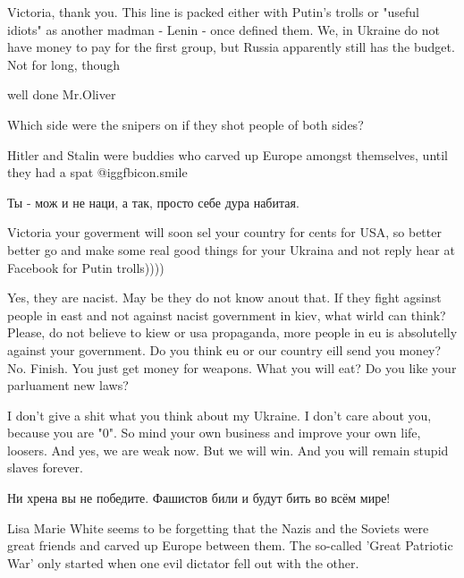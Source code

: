 \begin{itemize}
\begin{itemize}

Victoria, thank you. This line is packed either with Putin's trolls or "useful
idiots" as another madman - Lenin - once defined them. We, in Ukraine do not
have money to pay for the first group, but Russia apparently still has the
budget. Not for long, though


well done Mr.Oliver

Which side were the snipers on if they shot people of both sides?

Hitler and Stalin were buddies who carved up Europe amongst themselves, until they had a spat  @igg{fbicon.smile} 

Ты - мож и не наци, а так, просто себе дура набитая.


Victoria your goverment will soon sel your country for cents for USA, so better
better go and make some real good things for your Ukraina and not reply hear at
Facebook for Putin trolls))))


Yes, they are nacist. May be they do not know anout that. If they fight agsinst
people in east and not against nacist government in kiev, what wirld can think?
Please, do not believe to kiew or usa propaganda, more people in eu is
absolutelly against your government. Do you think eu or our country eill send
you money? No. Finish. You just get money for weapons. What you will eat? Do
you like your parluament new laws?


I don't give a shit what you think about my Ukraine. I don't care about you,
because you are "0". So mind your own business and improve your own life,
loosers. And yes, we are weak now. But we will win. And you will remain stupid
slaves forever.


Ни хрена вы не победите. Фашистов били и будут бить во всём мире!


Lisa Marie White seems to be forgetting that the Nazis and the Soviets were
great friends and carved up Europe between them. The so-called 'Great Patriotic
War' only started when one evil dictator fell out with the other.



\end{itemize}
\end{itemize}
